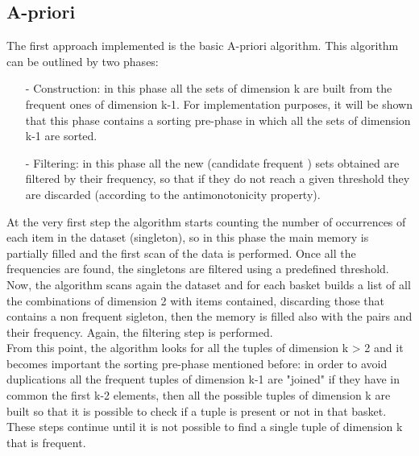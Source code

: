 \documentclass[14pt]{extarticle}
\begin{document}
\subsection{A-priori}
The first approach implemented is the basic A-priori algorithm. This algorithm can be outlined by two phases: 
\begin{itemize}[leftmargin=*]
	\vspace{-0.4cm}\item[-] Construction: in this phase all the sets of dimension k are built from the frequent ones of dimension k-1. For implementation purposes, it will be shown that this phase contains a sorting pre-phase in which all the sets of dimension k-1 are sorted.
	\vspace{-1.1cm}\item[-] Filtering: in this phase all the new (candidate frequent ) sets obtained are filtered by their frequency, so that if they do not reach a given threshold they are discarded (according to the antimonotonicity property).
\end{itemize}
At the very first step the algorithm starts counting the number of occurrences of each item in the dataset (singleton), so in this phase the main memory is partially filled and the first scan of the data is performed. Once all the frequencies are found, the singletons are filtered using a predefined threshold.\\
Now, the algorithm scans again the dataset and for each basket builds a list of all the combinations of dimension 2 with items contained, discarding those that contains a non frequent sigleton, then the memory is filled also with the pairs and their frequency. Again, the filtering step is performed.\\
From this point, the algorithm looks for all the tuples of dimension k > 2 and it becomes important the sorting pre-phase mentioned before: in order to avoid duplications all the frequent tuples of dimension k-1 are "joined" if they have in common the first k-2 elements, then all the possible tuples of dimension k are built so that it is possible to check if a tuple is present or not in that basket.\\
These steps continue until it is not possible to find a single tuple of dimension k that is frequent.
\end{document}
